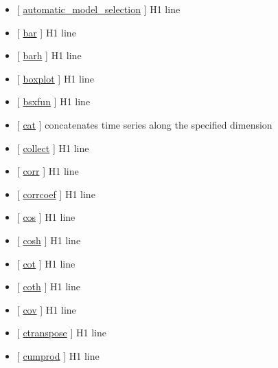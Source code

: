 \documentclass[letterpaper,10pt,english]{sphinxmanual}
\begin{document}
\begin{itemize}
\item {} 
{[} {\hyperref[classes/time_series/@ts/ts:automatic-model-selection]{automatic\_model\_selection}} {]}   H1 line

\item {} 
{[} {\hyperref[classes/time_series/@ts/ts:bar]{bar}} {]}   H1 line

\item {} 
{[} {\hyperref[classes/time_series/@ts/ts:barh]{barh}} {]}   H1 line

\item {} 
{[} {\hyperref[classes/time_series/@ts/ts:boxplot]{boxplot}} {]}   H1 line

\item {} 
{[} {\hyperref[classes/time_series/@ts/ts:bsxfun]{bsxfun}} {]}   H1 line

\item {} 
{[} {\hyperref[classes/time_series/@ts/ts:cat]{cat}} {]} concatenates time series along the specified dimension

\item {} 
{[} {\hyperref[classes/time_series/@ts/ts:collect]{collect}} {]}   H1 line

\item {} 
{[} {\hyperref[classes/time_series/@ts/ts:corr]{corr}} {]}   H1 line

\item {} 
{[} {\hyperref[classes/time_series/@ts/ts:corrcoef]{corrcoef}} {]}   H1 line

\item {} 
{[} {\hyperref[classes/time_series/@ts/ts:cos]{cos}} {]}   H1 line

\item {} 
{[} {\hyperref[classes/time_series/@ts/ts:cosh]{cosh}} {]}   H1 line

\item {} 
{[} {\hyperref[classes/time_series/@ts/ts:cot]{cot}} {]}   H1 line

\item {} 
{[} {\hyperref[classes/time_series/@ts/ts:coth]{coth}} {]}   H1 line

\item {} 
{[} {\hyperref[classes/time_series/@ts/ts:cov]{cov}} {]}   H1 line

\item {} 
{[} {\hyperref[classes/time_series/@ts/ts:ctranspose]{ctranspose}} {]}   H1 line

\item {} 
{[} {\hyperref[classes/time_series/@ts/ts:cumprod]{cumprod}} {]}   H1 line


\end{itemize}
\end{document}
